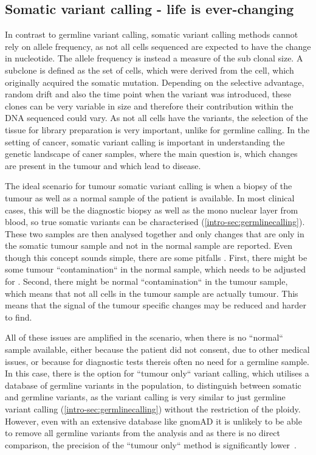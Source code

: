\subsection[Somatic]{Somatic variant calling - life is ever-changing}
\label{intro-sec:somaticcalling}
In contrast to germline variant calling, somatic variant calling methods cannot rely on allele frequency, as not all cells sequenced are expected to have the change in nucleotide. The allele frequency is instead a measure of the sub clonal size. A subclone is defined as the set of cells, which were derived from the cell, which originally acquired the somatic mutation. Depending on the selective advantage, random drift and also the time point when the variant was introduced, these clones can be very variable in size and therefore their contribution within the DNA sequenced could vary.
As not all cells have the variants, the selection of the tissue for library preparation is very important, unlike for germline calling. 
In the setting of cancer, somatic variant calling is important in understanding the genetic landscape of caner samples, where the main question is, which changes are present in the tumour and which lead to disease.

The ideal scenario for tumour somatic variant calling is when a biopsy of the tumour as well as a normal sample of the patient is available. In most clinical cases, this will be the diagnostic biopsy as well as the mono nuclear layer from blood, so true somatic variants can be characterised (\autoref{intro-sec:germlinecalling}). 
These two samples are then analysed together and only changes that are only in the somatic tumour sample and not in the normal sample are reported. Even though this concept sounds simple, there are some pitfalls \cite{GATKTeam2021a}. First, there might be some tumour ``contamination`` in the normal sample, which needs to be adjusted for \cite{Kim2018,TaylorWeiner2018}. Second, there might be normal ``contamination`` in the tumour sample, which means that not all cells in the tumour sample are actually tumour. This means that the signal of the tumour specific changes may be reduced and harder to find.

All of these issues are amplified in the scenario, when there is no ``normal`` sample available, either because the patient did not consent, due to other medical issues, or because for diagnostic tests thereis often no need for a germline sample. In this case, there is the option for ``tumour only`` variant calling, which utilises a database of germline variants in the population, to distinguish between somatic and germline variants, as the variant calling is very similar to just germline variant calling (\autoref{intro-sec:germlinecalling}) without the restriction of the ploidy. However, even with an extensive database like gnomAD \cite{Karczewski2020} it is unlikely to be able to remove all germline variants from the analysis and as there is no direct comparison, the precision of the ``tumour only`` method is significantly lower~\cite{Karimnezhad2020}.
